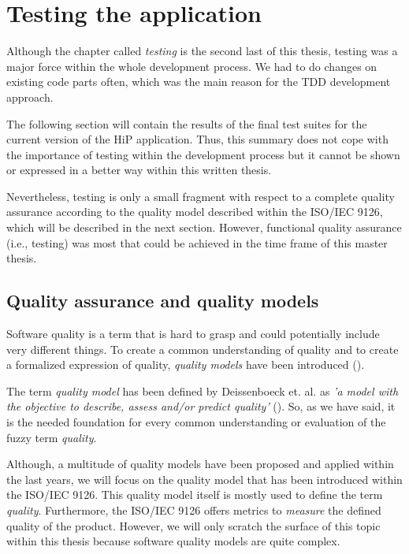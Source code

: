\chapter[Testing the application]{Testing the application}
Although the chapter called \textit{testing} is the second last of this thesis, testing was a major force within the whole development process. We had to do changes on existing code parts often, which was the main reason for the \ac{TDD} development approach. 

The following section will contain the results of the final test suites for the current version of the HiP application. Thus, this summary does not cope with the importance of testing within the development process but it cannot be shown or expressed in a better way within this written thesis. 

Nevertheless, testing is only a small fragment with respect to a complete quality assurance according to the quality model described within the ISO/IEC 9126, which will be described in the next section. However, functional quality assurance (i.e., testing) was most that could be achieved in the time frame of this master thesis. 

\section{Quality assurance and quality models}
Software quality is a term that is hard to grasp and could potentially include very different things. To create a common understanding of quality and to create a formalized expression of quality, \emph{quality models} have been introduced (\cite{waghmodesoftware}). 

The term \emph{quality model} has been defined by Deissenboeck et. al. as \emph{'a model with the objective to describe, assess and/or predict quality'}  (\cite{deissenboeck2009software}). So, as we have said, it is the needed foundation for every common understanding or evaluation of the fuzzy term \emph{quality}.

Although, a multitude of quality models have been proposed and applied within the last years, we will focus on the quality model that has been introduced within the ISO/IEC 9126. This quality model itself is mostly used to define the term \emph{quality}. Furthermore, the ISO/IEC 9126 offers metrics to \emph{measure} the defined quality of the product. However, we will only scratch the surface of this topic within this thesis because software quality models are quite complex.

